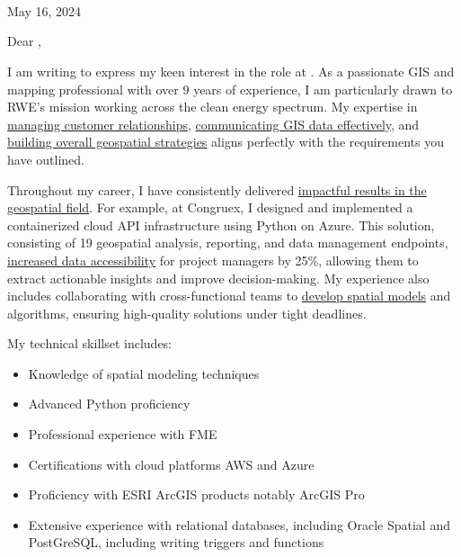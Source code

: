 \documentclass[letterpaper]{article}
\newcommand{\impt}[1]{\uline{#1}}
\begin{document}
\large
\JobManager \\
\JobManagerTitle \\
\textbf{\JobCompany} \\

\null\hfill May 16, 2024

Dear \JobManagerShort,

I am writing to express my keen interest in the
\impt{\JobTitle} role at {\JobCompany}.
As a passionate GIS and mapping professional with over 9 years of
experience, I am particularly drawn to RWE's mission working across the clean energy spectrum.
My expertise in \impt{managing customer relationships},
\impt{communicating GIS data effectively},
and \impt{building overall geospatial strategies}
aligns perfectly with the requirements you have outlined.

Throughout my career, I have consistently delivered
\impt{impactful results in the geospatial field}.
For example, at Congruex, I designed and implemented a
containerized cloud API infrastructure using Python on Azure.
This solution, consisting of 19 geospatial analysis, reporting, and data management endpoints,
\impt{increased data accessibility} for project managers by 25\%, allowing them to
extract actionable insights and improve decision-making.
My experience also includes collaborating with cross-functional teams to
\impt{develop spatial models} and algorithms, ensuring high-quality solutions under tight deadlines.


\iffalse
- Collaborate with cross-functional teams,
- suitability analysis
· Organize and maintain geospatial datasets
- Design web-based and static GIS products to communicate GIS data effectively to other teams and stakeholders
· Collaborate with cross-functional teams
- Knowledge of spatial modeling techniques
- ability to manage customer relationships
- leadership and communication, and ability to meet deadlines
- Strong organization skills and ability to coordinate multiple tasks and deliverables
- build relationships, and effectively communicate
\fi

My technical skillset includes:

\vspace{-12pt}
\begin{itemize} \itemsep 0pt
\item Knowledge of spatial modeling techniques
\item Advanced Python proficiency
\item Professional experience with FME
\item Certifications with cloud platforms AWS and Azure
\item Proficiency with ESRI ArcGIS products notably ArcGIS Pro
\item Extensive experience with relational databases, including Oracle Spatial and PostGreSQL,
    including writing triggers and functions
\end{itemize}
\end{document}
